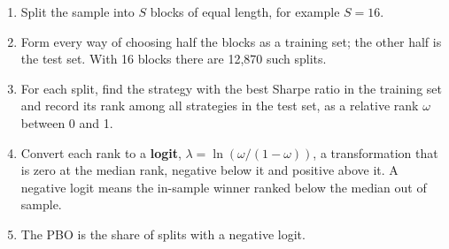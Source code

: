 \begin{enumerate}
  \item Split the sample into $S$ blocks of equal length, for example $S = 16$.
  \item Form every way of choosing half the blocks as a training set; the other half is the test set. With 16 blocks there are 12,870 such splits.
  \item For each split, find the strategy with the best Sharpe ratio in the training set and record its rank among all strategies in the test set, as a relative rank $\omega$ between 0 and 1.
  \item Convert each rank to a \textbf{logit}, $\lambda = \ln(\omega / (1 - \omega))$, a transformation that is zero at the median rank, negative below it and positive above it. A negative logit means the in-sample winner ranked below the median out of sample.
  \item The PBO is the share of splits with a negative logit.
\end{enumerate}


